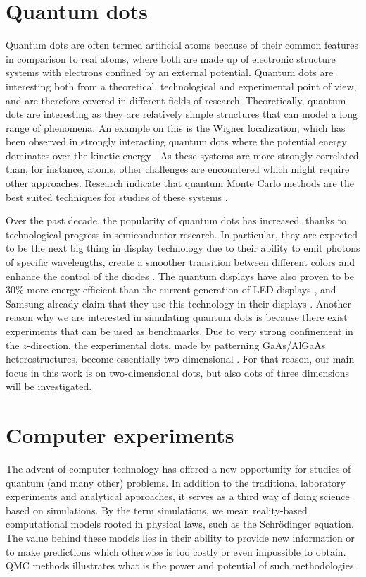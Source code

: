 \section{Quantum dots}
Quantum dots are often termed artificial atoms because of their common features in comparison to real atoms, where both are made up of electronic structure systems with electrons confined by an external potential. Quantum dots are interesting both from a theoretical, technological and experimental point of view, and are therefore covered in different fields of research. Theoretically, quantum dots are interesting as they are relatively simple structures that can model a long range of phenomena. An example on this is the Wigner localization, which has been observed in strongly interacting quantum dots where the potential energy dominates over the kinetic energy \supercite{ghosal_incipient_2007, hogberget_quantum_2013}. As these systems are more strongly correlated than, for instance, atoms, other challenges are encountered which might require other approaches. Research indicate that quantum Monte Carlo methods are the best suited techniques for studies of these systems \supercite{ghosal_incipient_2007}.

Over the past decade, the popularity of quantum dots has increased, thanks to technological progress in semiconductor research. In particular, they are expected to be the next big thing in display technology due to their ability to emit photons of specific wavelengths, create a smoother transition between different colors and enhance the control of the diodes \supercite{noauthor_samsung_nodate}. The quantum displays have also proven to be 30\% more energy efficient than the current generation of LED displays \supercite{manders_8.3:_2015}, and Samsung already claim that they use this technology in their displays \supercite{noauthor_samsung_nodate}. Another reason why we are interested in simulating quantum dots is because there exist experiments that can be used as benchmarks. Due to very strong confinement in the $z$-direction, the experimental dots, made by patterning GaAs/AlGaAs heterostructures, become essentially two-dimensional \supercite{marzin_photoluminescence_1994,brunner_sharp-line_1994}. For that reason, our main focus in this work is on two-dimensional dots, but also dots of three dimensions will be investigated.

\section{Computer experiments}
The advent of computer technology has offered a new opportunity for studies of quantum (and many other) problems. In addition to the traditional laboratory experiments and analytical approaches, it serves as a third way of doing science based on simulations. By the term simulations, we mean reality-based computational models rooted in physical laws, such as the Schrödinger equation. The value behind these models lies in their ability to provide new information or to make predictions which otherwise is too costly or even impossible to obtain. QMC methods illustrates what is the power and potential of such methodologies.

